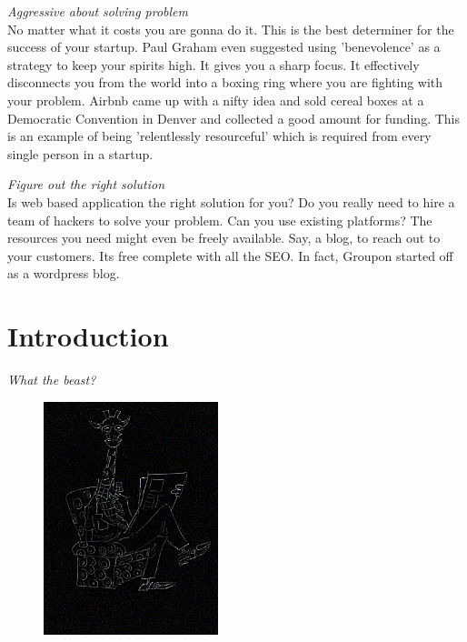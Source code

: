 \documentclass[12pt]{book}
\begin{document}
\par
\noindent\textit{Aggressive about solving problem}\\
No matter what it costs you are gonna do it. This is the best determiner for the success of your startup. Paul Graham even suggested using 'benevolence' as a strategy to keep your spirits high.
It gives you a sharp focus. It effectively disconnects you from the world into a boxing ring where you are fighting with your problem.
Airbnb came up with a nifty idea and sold cereal boxes at a Democratic Convention in Denver and collected a good amount for funding. This is an example of being 'relentlessly resourceful' which is required from every single person in a startup.

\par
\noindent\textit{Figure out the right solution}\\
Is web based application the right solution for you? Do you really need to hire a team of hackers to solve your problem.
Can you use existing platforms? The resources you need might even be freely available. Say, a blog, to reach out to your customers. Its free complete with all the SEO. In fact, Groupon started off as a wordpress blog.


\chapter{Introduction}
\begin{flushright}\textit{What the beast?}\end{flushright}

\begin{figure}
\begin{center}\includegraphics[width=2in]{org/art/takingHelp.png}\end{center}
\end{figure}
\end{document}
